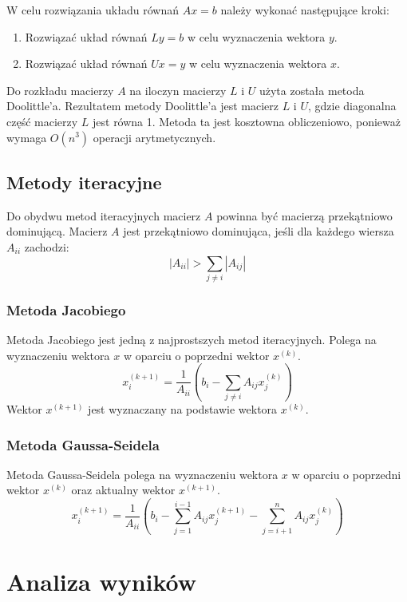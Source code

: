 \documentclass[a4paper,12pt]{article}  %
\begin{document}
W celu rozwiązania układu równań $Ax = b$ należy wykonać następujące kroki:
\begin{enumerate}
    \item Rozwiązać układ równań $Ly = b$ w celu wyznaczenia wektora $y$.
    \item Rozwiązać układ równań $Ux = y$ w celu wyznaczenia wektora $x$.
\end{enumerate}
Do rozkładu macierzy $A$ na iloczyn macierzy $L$ i $U$ użyta została
metoda Doolittle'a. Rezultatem metody Doolittle'a jest macierz $L$ i $U$,
gdzie diagonalna część macierzy $L$ jest równa 1. Metoda ta jest kosztowna
obliczeniowo, ponieważ wymaga $O(n^3)$ operacji arytmetycznych.
\subsection{Metody iteracyjne}
Do obydwu metod iteracyjnych macierz $A$ powinna być macierzą
przekątniowo dominującą.
Macierz $A$ jest przekątniowo dominująca, jeśli dla każdego wiersza
$A_{ii}$ zachodzi:
\begin{equation}
    |A_{ii}| > \sum_{j \neq i} |A_{ij}|
\end{equation}

\subsubsection{Metoda Jacobiego}
Metoda Jacobiego jest jedną z najprostszych metod iteracyjnych. Polega na
wyznaczeniu wektora $x$ w oparciu o poprzedni wektor $x^{(k)}$.
\begin{equation}
    x^{(k+1)}_i = \frac{1}{A_{ii}} \left( b_i - \sum_{j \neq i} A_{ij} x^{(k)}_j \right)
\end{equation}
Wektor $x^{(k+1)}$ jest wyznaczany na podstawie wektora $x^{(k)}$.

\subsubsection{Metoda Gaussa-Seidela}
Metoda Gaussa-Seidela polega na wyznaczeniu wektora $x$ w oparciu o
poprzedni wektor $x^{(k)}$ oraz aktualny wektor $x^{(k+1)}$.
\begin{equation}
  x^{(k+1)}_i = \frac{1}{A_{ii}} \left( b_i - \sum_{j = 1}^{i-1} A_{ij}
  x^{(k+1)}_j - \sum_{j = i+1}^{n} A_{ij} x^{(k)}_j \right)
\end{equation}

\section{Analiza wyników}
\end{document}
